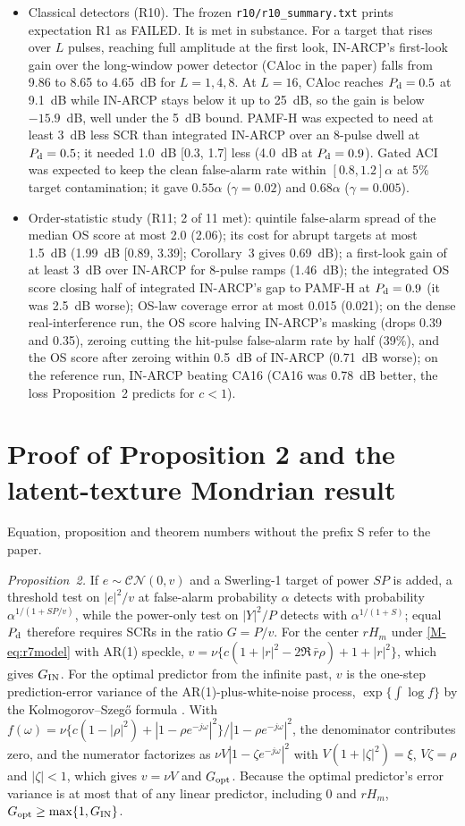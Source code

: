\documentclass[10pt]{article}
\begin{document}
\begin{itemize}
\item Classical detectors (R10). The frozen \texttt{r10/r10\_summary.txt} prints expectation R1 as FAILED. It is met in substance. For a target that rises over $L$ pulses, reaching full amplitude at the first look, IN-ARCP's first-look gain over the long-window power detector (CAloc in the paper) falls from 9.86 to 8.65 to 4.65~dB for $L=1,4,8$. At $L=16$, CAloc reaches $P_{\rm d}=0.5$ at 9.1~dB while IN-ARCP stays below it up to 25~dB, so the gain is below $-15.9$~dB, well under the 5~dB bound. PAMF-H was expected to need at least 3~dB less SCR than integrated IN-ARCP over an 8-pulse dwell at $P_{\rm d}=0.5$; it needed 1.0~dB [0.3, 1.7] less (4.0~dB at $P_{\rm d}=0.9$). Gated ACI was expected to keep the clean false-alarm rate within $[0.8,1.2]\alpha$ at 5\% target contamination; it gave $0.55\alpha$ ($\gamma=0.02$) and $0.68\alpha$ ($\gamma=0.005$).
\item Order-statistic study (R11; 2 of 11 met): quintile false-alarm spread of the median OS score at most 2.0 (2.06); its cost for abrupt targets at most 1.5~dB (1.99~dB [0.89, 3.39]; Corollary~3 gives 0.69~dB); a first-look gain of at least 3~dB over IN-ARCP for 8-pulse ramps (1.46~dB); the integrated OS score closing half of integrated IN-ARCP's gap to PAMF-H at $P_{\rm d}=0.9$ (it was 2.5~dB worse); OS-law coverage error at most 0.015 (0.021); on the dense real-interference run, the OS score halving IN-ARCP's masking (drops 0.39 and 0.35), zeroing cutting the hit-pulse false-alarm rate by half (39\%), and the OS score after zeroing within 0.5~dB of IN-ARCP (0.71~dB worse); on the reference run, IN-ARCP beating CA16 (CA16 was 0.78~dB better, the loss Proposition~2 predicts for $c<1$).
\end{itemize}


\section{Proof of Proposition 2 and the latent-texture Mondrian result}
Equation, proposition and theorem numbers without the prefix S refer to the paper.

\emph{Proposition~2.} If $e\sim\mathcal{CN}(0,v)$ and a Swerling-1 target of power $SP$ is added, a threshold test on $|e|^2/v$ at false-alarm probability $\alpha$ detects with probability $\alpha^{1/(1+SP/v)}$, while the power-only test on $|Y|^2/P$ detects with $\alpha^{1/(1+S)}$; equal $P_{\rm d}$ therefore requires SCRs in the ratio $G=P/v$. For the center $rH_m$ under \eqref{M-eq:r7model} with AR(1) speckle, $v=\nu\{c(1+|r|^2-2\Re\,\bar r\rho)+1+|r|^2\}$, which gives $G_{\rm IN}$. For the optimal predictor from the infinite past, $v$ is the one-step prediction-error variance of the AR(1)-plus-white-noise process, $\exp\{\int\log f\}$ by the Kolmogorov--Szeg\H{o} formula \cite{S-brockwell1991}. With $f(\omega)=\nu\{c(1-|\rho|^2)+|1-\rho e^{-j\omega}|^2\}/|1-\rho e^{-j\omega}|^2$, the denominator contributes zero, and the numerator factorizes as $\nu V|1-\zeta e^{-j\omega}|^2$ with $V(1+|\zeta|^2)=\xi$, $V\zeta=\rho$ and $|\zeta|<1$, which gives $v=\nu V$ and $G_{\rm opt}$. Because the optimal predictor's error variance is at most that of any linear predictor, including $0$ and $rH_m$, $G_{\rm opt}\ge\max\{1,G_{\rm IN}\}$.
\end{document}

